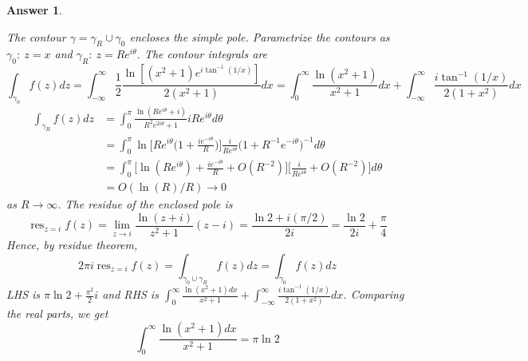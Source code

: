 \documentclass[a4paper]{article}
\DeclareMathOperator{\res}{res}
\newtheorem{ans}{Answer}[section]
\theoremstyle{new}
\begin{document}
\begin{ans}
\begin{enumerate}[label=(\roman*)]
\begin{center}
  \end{center}
The contour $\gamma=\gamma_R\cup\gamma_0$ encloses the simple pole. Parametrize the contours as $\gamma_0:~z=x$ and $\gamma_R:~z=Re^{i\theta}$. The contour integrals are
$$\int_{\gamma_0}f(z)dz=\int_{-\infty}^\infty\frac{1}{2}\frac{\ln[(x^2+1)e^{i\tan^{-1}(1/x)}]}{2(x^2+1)}dx=\int_0^\infty\frac{\ln(x^2+1)}{x^2+1}dx+\int_{-\infty}^\infty\frac{i\tan^{-1}(1/x)}{2(1+x^2)}dx$$
\begin{align}
\int_{\gamma_R}f(z)dz&=\int_0^\pi\frac{\ln(Re^{i\theta}+i)}{R^2e^{2i\theta}+1}iRe^{i\theta}d\theta\nonumber\\&=\int_0^\pi\ln\bigg[Re^{i\theta}\bigg(1+\frac{ie^{-i\theta}}{R}\bigg)\bigg]\frac{i}{Re^{i\theta}}\bigg(1+R^{-1}e^{-i\theta}\bigg)^{-1}d\theta\nonumber\\&=\int_0^\pi\bigg[\ln(Re^{i\theta})+\frac{ie^{-i\theta}}{R}+O(R^{-2})\bigg]\bigg[\frac{i}{Re^{i\theta}}+O(R^{-2})\bigg]d\theta\nonumber\\&=O(\ln(R)/R)\rightarrow0\nonumber
\end{align}
as $R\rightarrow\infty$. The residue of the enclosed pole is
$$\res_{z=i}f(z)=\lim_{z\rightarrow i}\frac{\ln(z+i)}{z^2+1}(z-i)=\frac{\ln2+i(\pi/2)}{2i}=\frac{\ln 2}{2i}+\frac{\pi}{4}$$
Hence, by residue theorem,
$$2\pi i\res_{z=i}f(z)=\int_{\gamma_0\cup\gamma_R}f(z)dz=\int_{\gamma_0}f(z)dz$$
LHS is $\pi \ln 2+\frac{\pi^2}{2}i$ and RHS is $\int_0^\infty\frac{\ln(x^2+1)dx}{x^2+1}+\int_{-\infty}^\infty\frac{i\tan^{-1}(1/x)}{2(1+x^2)}dx$. Comparing the real parts, we get
$$\int_0^\infty\frac{\ln(x^2+1)dx}{x^2+1}=\pi \ln 2$$
\end{enumerate}
\end{ans}
\end{document}
